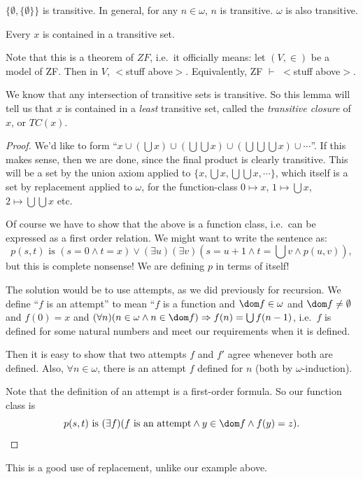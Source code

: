 \documentclass[a4paper]{article}
\begin{document}
\begin{eg}
  $\{\emptyset, \{\emptyset\}\}$ is transitive. In general, for any $n\in \omega$, $n$ is transitive. $\omega$ is also transitive.
\end{eg}

\begin{lemma}
  Every $x$ is contained in a transitive set.
\end{lemma}
Note that this is a theorem of $ZF$, i.e.\ it officially means: let $(V, \in)$ be a model of ZF. Then in $V$, $<$stuff above$>$. Equivalently, ZF $\vdash$ $<$stuff above$>$.

We know that any intersection of transitive sets is transitive. So this lemma will tell us that $x$ is contained in a \emph{least} transitive set, called the \emph{transitive closure} of $x$, or $TC(x)$.

\begin{proof}
  We'd like to form ``$x\cup (\bigcup x)\cup (\bigcup\bigcup x)\cup (\bigcup\bigcup\bigcup x)\cup \cdots$''. If this makes sense, then we are done, since the final product is clearly transitive. This will be a set by the union axiom applied to $\{x, \bigcup x, \bigcup\bigcup x, \cdots\}$, which itself is a set by replacement applied to $\omega$, for the function-class $0\mapsto x$, $1\mapsto \bigcup x$, $2\mapsto \bigcup\bigcup x$ etc.

  Of course we have to show that the above is a function class, i.e.\ can be expressed as a first order relation. We might want to write the sentence as:
  \[
    p(s, t)\text{ is }(s = 0\wedge t = x)\vee (\exists u)(\exists v)(s = u + 1\wedge t = \textstyle{\bigcup} v \wedge p(u, v)),
  \]
  but this is complete nonsense! We are defining $p$ in terms of itself!

  The solution would be to use attempts, as we did previously for recursion. We define ``$f$ is an attempt'' to mean ``$f$ is a function and $\dom f\in \omega$ and $\dom f\not=\emptyset$ and $f(0) = x$ and $(\forall n)(n\in \omega \wedge n\in \dom f)\Rightarrow f(n) = \bigcup f(n - 1)$, i.e.\ $f$ is defined for some natural numbers and meet our requirements when it is defined.

  Then it is easy to show that two attempts $f$ and $f'$ agree whenever both are defined. Also, $\forall n\in \omega$, there is an attempt $f$ defined for $n$ (both by $\omega$-induction).

  Note that the definition of an attempt is a first-order formula. So our function class is
  \[
    p(s, t)\text{ is } (\exists f)(f\text{ is an attempt}\wedge y\in \dom f \wedge f(y) = z).\qedhere
  \]
\end{proof}
This is a good use of replacement, unlike our example above.
\end{document}
